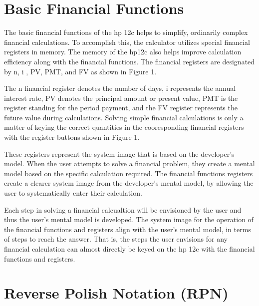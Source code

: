 \documentclass{article}
\begin{document}
\section{Basic Financial Functions}

The basic financial functions of the hp 12c helps to simplify, ordinarily complex financial calculations. To accomplish this, the calculator utilizes special financial registers in memory. The memory of the hp12c also helps improve calculation efficiency along with the financial functions. The financial registers are designated by n, i , PV, PMT, and FV as shown in Figure 1.

The n financial register denotes the number of days, i represents the annual interest rate, PV denotes the principal amount or present value, PMT is the register standing for the period payment, and the FV register represents the future value during calculations. Solving simple financial calculations is only a matter of keying the correct quantities in the cooresponding financial registers with the register buttons shown in Figure 1.

These registers represent the system image that is based on the developer's model. When the user attempts to solve a financial problem, they create a mental model based on the specific calculation required. The financial functions registers create a clearer system image from the developer's mental model, by allowing the user to systematically enter their calculation. 

Each step in solving a financial calcualtion will be envisioned by the user and thus the user's mental model is developed. The system image for the operation of the financial functions and registers align with the user's mental model, in terms of steps to reach the answer. That is, the steps the user envisions for any financial calculation can almost directly be keyed on the hp 12c with the financial functions and registers.

\section{Reverse Polish Notation (RPN)}
\end{document}
